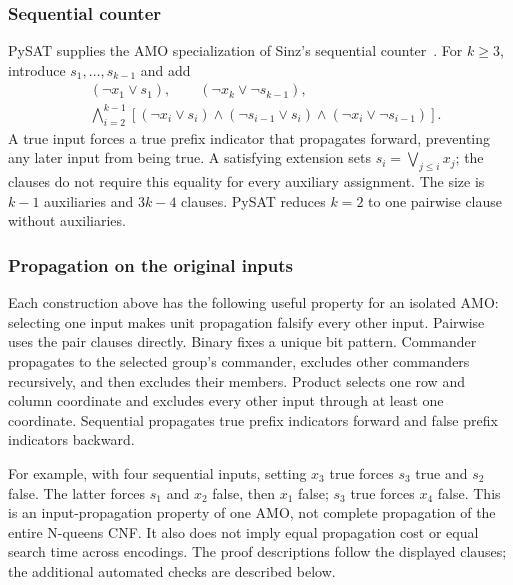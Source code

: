 \subsubsection{Sequential counter}
PySAT supplies the AMO specialization of Sinz's sequential
counter~\cite{sinz}. For $k\ge3$, introduce $s_1,\ldots,s_{k-1}$ and add
\begin{align}
&(\neg x_1\vee s_1),\qquad(\neg x_k\vee\neg s_{k-1}),\nonumber\\
&\bigwedge_{i=2}^{k-1}
\left[(\neg x_i\vee s_i)\wedge(\neg s_{i-1}\vee s_i)
\wedge(\neg x_i\vee\neg s_{i-1})\right].
\end{align}
A true input forces a true prefix indicator that propagates forward,
preventing any later input from being true. A satisfying extension sets
$s_i=\bigvee_{j\le i}x_j$; the clauses do not require this equality for
every auxiliary assignment. The size is $k-1$ auxiliaries and $3k-4$
clauses. PySAT reduces $k=2$ to one pairwise clause without auxiliaries.

\subsubsection{Propagation on the original inputs}
Each construction above has the following useful property for an isolated
AMO: selecting one input makes unit propagation falsify every other input.
Pairwise uses the pair clauses directly. Binary fixes a unique bit pattern.
Commander propagates to the selected group's commander, excludes other
commanders recursively, and then excludes their members. Product selects
one row and column coordinate and excludes every other input through at
least one coordinate. Sequential propagates true prefix indicators forward
and false prefix indicators backward.

For example, with four sequential inputs, setting $x_3$ true forces
$s_3$ true and $s_2$ false. The latter forces $s_1$ and $x_2$ false, then
$x_1$ false; $s_3$ true forces $x_4$ false. This is an input-propagation
property of one AMO, not complete propagation of the entire N-queens CNF.
It also does not imply equal propagation cost or equal search time across
encodings. The proof descriptions follow the displayed clauses; the
additional automated checks are described below.
